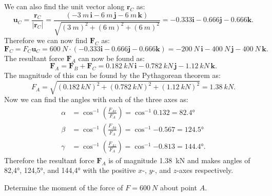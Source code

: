 \documentclass[a4paper]{article}
\begin{document}
We can also find the unit vector along $\textbf{r}_C$ as:
\[ 
\textbf{u}_C = \frac{\textbf{r}_C}{\left| \textbf{r}_C \right|} = \frac{\left( - \qty{3}{m} \, \textbf{i} - \qty{6}{m} \, \textbf{j} - \qty{6}{m}\, \textbf{k} \right)}{\sqrt{\left( \qty{3}{m}  \right)^2 + \left( \qty{6}{m}  \right)^2 + \left( \qty{6}{m}  \right)^2}} = - \num{0,333} \textbf{i} - \num{0,666} \textbf{j} - \num{0,666} \textbf{k}
.\]
Therefore we can now find $\textbf{F}_C$ as:
\[ 
\textbf{F}_C = F_C \textbf{u}_C = \qty{600}{N} \cdot \left( -\num{0,333} \textbf{i} - \num{0,666} \textbf{j} - \num{0,666}  \textbf{k} \right) = - \qty{200}{N} \, \textbf{i} - \qty{400}{N} \, \textbf{j} - \qty{400}{N} \, \textbf{k}
.\]
The resultant force $\textbf{F}_A$ can now be found as:
\[ 
  \textbf{F}_A = \textbf{F}_B + \textbf{F}_C = \qty{0,182}{kN} \, \textbf{i} - \qty{0,782}{kN} \, \textbf{j} - \qty{1,12}{kN} \, \textbf{k}
.\]
The magnitude of this can be found by the Pythagorean theorem as:
\[ 
F_A = \sqrt{\left( \qty{0,182}{kN}  \right)^2 + \left( \qty{0,782}{kN}  \right)^2 +( \qty{1,12}{kN} )^2} = \qty{1,38}{kN} 
.\]
Now we can find the angles with each of the three axes as:
\begin{align*}
  \alpha &= \cos^{-1} \left( \frac{F_{Ax}}{F_A} \right) = \cos^{-1} \num{0,132} = \ang{82,4} \\
  \beta &= \cos^{-1} \left( \frac{F_{Ay}}{F_A} \right) = \cos^{-1} \num{-0,567} = \ang{124,5}  \\
  \gamma &= \cos^{-1} \left( \frac{F_{Az}}{F_A} \right) = \cos^{-1} \num{-0,813} = \ang{144,4} 
.\end{align*}
Therefore the resultant force $\textbf{F}_A$ is of magnitude \qty{1,38}{kN} and makes angles of \ang{82,4}, \ang{124,5}, and \ang{144,4} with the positive $x$-, $y$-, and $z$-axes respectively. 


Determine the moment of the force of $F = \qty{600}{N}$ about point $A$.
\end{document}
